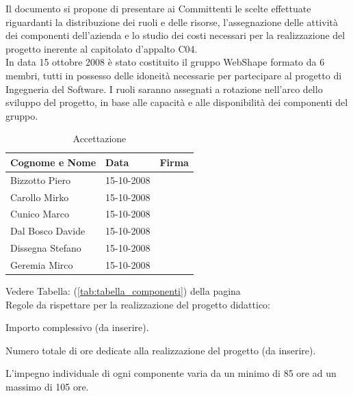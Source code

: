
Il documento si propone di presentare ai Committenti le scelte effettuate riguardanti la distribuzione dei ruoli e delle risorse, l'assegnazione delle attivit\`a dei componenti dell'azienda e lo studio dei costi necessari per la realizzazione del progetto inerente al capitolato d'appalto C04.\\

In data 15 ottobre 2008 \`e stato costituito il gruppo WebShape formato da 6 membri, tutti in possesso delle idoneit\`a necessarie per partecipare al progetto di Ingegneria del Software.
I ruoli saranno assegnati a rotazione nell'arco dello sviluppo del progetto, in base alle capacit\`a e alle disponibilit\`a dei componenti del gruppo.\\

\begin{table}[h]
	\begin{center}
		  \begin{tabular}{|p{}|l|p{}|}
		 \hline 
		 \textbf{Cognome e Nome} & \textbf{Data} & \textbf{Firma}\\
		 \hline
		Bizzotto Piero & 15-10-2008 & \\
		Carollo Mirko & 15-10-2008 & \\
		Cunico Marco & 15-10-2008 & \\
		Dal Bosco Davide & 15-10-2008 & \\
		Dissegna Stefano & 15-10-2008 & \\
		Geremia Mirco & 15-10-2008 & \\
		\hline
		\end{tabular}
	\caption{Accettazione} 
	\label{tabella_accettazione}
	\end{center}	
\end{table}



Vedere Tabella: (\ref{tab:tabella_componenti}) della pagina ~\pageref{tab:tabella_componenti}\\

Regole da rispettare per la realizzazione del progetto didattico:
\begin{elenconumerato}{\normindent}
				\item Importo complessivo (da inserire).\\
				\item Numero totale di ore dedicate alla realizzazione del progetto (da inserire).\\
				\item L'impegno individuale di ogni componente varia da un minimo di 85 ore ad un massimo di 105 ore.\\
			\end{elenconumerato}

